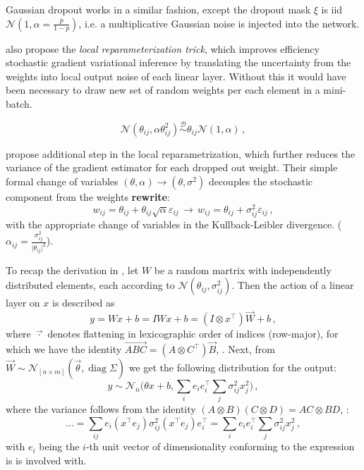 \documentclass[a4paper,10pt]{article}
\newcommand{\important}[1]{\textbf{\color{red} #1}}
\newcommand{\rewrite}{\important{rewrite}}
\renewcommand{\vec}{\overrightarrow}
\begin{document}
Gaussian dropout works in a similar fashion, except the dropout mask $\xi$ is iid
$\mathcal{N}(1, \alpha=\tfrac{p}{1-p})$, i.e. a multiplicative Gaussian noise is
injected into the network.


\cite{kingma_variational_2015} also propose the \textit{local reparameterization trick},
which improves efficiency stochastic gradient variational inference by translating
the uncertainty from the weights into local output noise of each linear layer. Without
this it would have been necessary to draw new set of random weights per each element
in a mini-batch.

$$
  \mathcal{N}(\theta_{ij}, \alpha \theta^2_{ij})
  \overset{\mathcal{D}}{\sim}
  \theta_{ij} \mathcal{N}(1, \alpha)
  \,, $$

\cite{molchanov_variational_2017} propose additional step in the local reparametrization,
which further reduces the variance of the gradient estimator for each dropped out
weight. Their simple formal change of variables $(\theta, \alpha) \to (\theta, \sigma^2)$
decouples the stochastic component from the weights \rewrite:
$$
  w_{ij} = \theta_{ij} + \theta_{ij} \sqrt{\alpha} \varepsilon_{ij}
  \,\to\,
  w_{ij} = \theta_{ij} + \sigma^2_{ij} \varepsilon_{ij}
  \,, $$
with the appropriate change of variables in the Kullback-Leibler divergence.
($\alpha_{ij} = \tfrac{\sigma_{ij}^2}{\lvert \theta_{ij}\rvert^2}$).

To recap the derivation in \cite{kingma_variational_2015}, let $W$ be a random martrix
with independently distributed elements, each according to $\mathcal{N}(\theta_{ij}, \sigma^2_{ij})$.
Then the action of a linear layer on $x$ is described as 
$$
  y = W x + b = I W x + b
    = (I \otimes x^\top) \vec{W} + b
  \,, $$
where $\vec{\cdot}$ denotes flattening in lexicographic order of indices (row-major),
for which we have the identity $\vec{A B C} = (A \otimes C^\top) \vec{B}$, \cite{cookbook2012}.
Next, from $\vec{W}\sim \mathcal{N}_{[n\times m]}(\vec{\theta}, \mathop{diag}\Sigma)$
we get the following distribution for the output:
$$
  y \sim \mathcal{N}_{n}
    \bigl(
      \theta x + b,
      \sum_{i} e_i e_i^\top \sum_j \sigma^2_{ij} x_j^2
    \bigr)
  \,, $$
where the variance follows from the identity $(A\otimes B)(C\otimes D) = AC\otimes BD$,
\cite{cookbook2012}:
$$
  \ldots
    = \sum_{ij} e_i (x^\top e_j) \sigma^2_{ij} (x^\top e_j) e_i^\top
    = \sum_{i} e_i e_i^\top \sum_j \sigma^2_{ij} x_j^2
  \,, $$
with $e_i$ being the $i$-th unit vector of dimensionality conforming to the expression
is is involved with.
\end{document}
